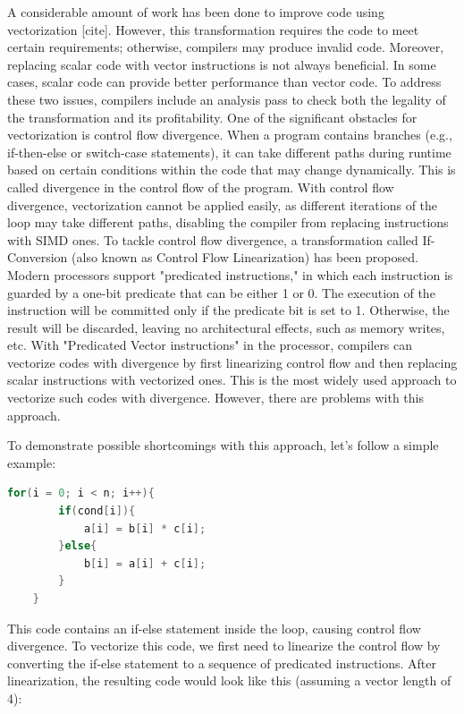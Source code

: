 \documentclass[\main/thesis.tex]{subfiles}
\begin{document}
A considerable amount of work has been done to improve code using vectorization [cite]. However, this transformation requires the code to meet certain requirements; otherwise, compilers may produce invalid code. Moreover, replacing scalar code with vector instructions is not always beneficial. In some cases, scalar code can provide better performance than vector code. To address these two issues, compilers include an analysis pass to check both the legality of the transformation and its profitability.
One of the significant obstacles for vectorization is control flow divergence. When a program contains branches (e.g., if-then-else or switch-case statements), it can take different paths during runtime based on certain conditions within the code that may change dynamically. This is called divergence in the control flow of the program. With control flow divergence, vectorization cannot be applied easily, as different iterations of the loop may take different paths, disabling the compiler from replacing instructions with SIMD ones.
To tackle control flow divergence, a transformation called If-Conversion (also known as Control Flow Linearization) has been proposed. Modern processors support "predicated instructions," in which each instruction is guarded by a one-bit predicate that can be either 1 or 0. The execution of the instruction will be committed only if the predicate bit is set to 1. Otherwise, the result will be discarded, leaving no architectural effects, such as memory writes, etc. With "Predicated Vector instructions" in the processor,
compilers can vectorize codes with divergence by first linearizing control flow and then replacing scalar instructions with vectorized ones. 
This is the most widely used approach to vectorize such codes with divergence. However, there are problems with this approach.

To demonstrate possible shortcomings with this approach, let's follow a simple example: 
\begin{lstlisting}[language=C, caption={Motivating Example}]
    for(i = 0; i < n; i++){
        if(cond[i]){
            a[i] = b[i] * c[i];
        }else{
            b[i] = a[i] + c[i];
        }
    }
\end{lstlisting}

This code contains an if-else statement inside the loop, causing control flow divergence. To vectorize this code, we first need to linearize the control flow by converting the if-else statement to a sequence of predicated instructions. After linearization, the resulting code would look like this (assuming a vector length of 4):
\end{document}
